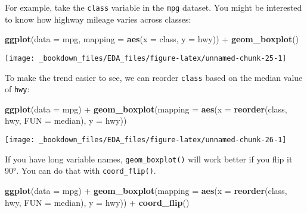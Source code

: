 \documentclass[]{book}
\newenvironment{Shaded}{\begin{snugshade}}{\end{snugshade}}
\newcommand{\KeywordTok}[1]{\textcolor[rgb]{0.13,0.29,0.53}{\textbf{{#1}}}}
\newcommand{\DataTypeTok}[1]{\textcolor[rgb]{0.13,0.29,0.53}{{#1}}}
\newcommand{\StringTok}[1]{\textcolor[rgb]{0.31,0.60,0.02}{{#1}}}
\newcommand{\NormalTok}[1]{{#1}}
\begin{document}
For example, take the \texttt{class} variable in the \texttt{mpg}
dataset. You might be interested to know how highway mileage varies
across classes:

\begin{Shaded}
\begin{Highlighting}[]
\KeywordTok{ggplot}\NormalTok{(}\DataTypeTok{data =} \NormalTok{mpg, }\DataTypeTok{mapping =} \KeywordTok{aes}\NormalTok{(}\DataTypeTok{x =} \NormalTok{class, }\DataTypeTok{y =} \NormalTok{hwy)) +}
\StringTok{  }\KeywordTok{geom_boxplot}\NormalTok{()}
\end{Highlighting}
\end{Shaded}

\begin{center}\texttt{[image: \_bookdown\_files/EDA\_files/figure-latex/unnamed-chunk-25-1]} \end{center}

To make the trend easier to see, we can reorder \texttt{class} based on
the median value of \texttt{hwy}:

\begin{Shaded}
\begin{Highlighting}[]
\KeywordTok{ggplot}\NormalTok{(}\DataTypeTok{data =} \NormalTok{mpg) +}
\StringTok{  }\KeywordTok{geom_boxplot}\NormalTok{(}\DataTypeTok{mapping =} \KeywordTok{aes}\NormalTok{(}\DataTypeTok{x =} \KeywordTok{reorder}\NormalTok{(class, hwy, }\DataTypeTok{FUN =} \NormalTok{median), }\DataTypeTok{y =} \NormalTok{hwy))}
\end{Highlighting}
\end{Shaded}

\begin{center}\texttt{[image: \_bookdown\_files/EDA\_files/figure-latex/unnamed-chunk-26-1]} \end{center}

If you have long variable names, \texttt{geom\_boxplot()} will work
better if you flip it 90°. You can do that with \texttt{coord\_flip()}.

\begin{Shaded}
\begin{Highlighting}[]
\KeywordTok{ggplot}\NormalTok{(}\DataTypeTok{data =} \NormalTok{mpg) +}
\StringTok{  }\KeywordTok{geom_boxplot}\NormalTok{(}\DataTypeTok{mapping =} \KeywordTok{aes}\NormalTok{(}\DataTypeTok{x =} \KeywordTok{reorder}\NormalTok{(class, hwy, }\DataTypeTok{FUN =} \NormalTok{median), }\DataTypeTok{y =} \NormalTok{hwy)) +}
\StringTok{  }\KeywordTok{coord_flip}\NormalTok{()}
\end{Highlighting}
\end{Shaded}
\end{document}
